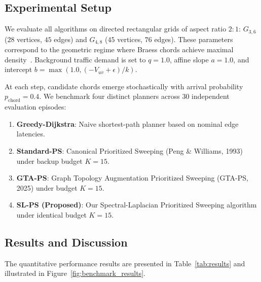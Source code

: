 \documentclass[11pt,a4paper]{article}
\begin{document}
\subsection{Experimental Setup}
We evaluate all algorithms on directed rectangular grids of aspect ratio $2:1$: $G_{3,6}$ ($28$ vertices, $45$ edges) and $G_{4,8}$ ($45$ vertices, $76$ edges). These parameters correspond to the geometric regime where Braess chords achieve maximal density~\cite{lu2026braess}. Background traffic demand is set to $q = 1.0$, affine slope $a = 1.0$, and intercept $b = \max(1.0, (-V_{uv} + \epsilon) / k)$.

At each step, candidate chords emerge stochastically with arrival probability $p_{\text{chord}} = 0.4$. We benchmark four distinct planners across 30 independent evaluation episodes:
\begin{enumerate}
    \item \textbf{Greedy-Dijkstra}: Naive shortest-path planner based on nominal edge latencies.
    \item \textbf{Standard-PS}: Canonical Prioritized Sweeping (Peng \& Williams, 1993) under backup budget $K = 15$.
    \item \textbf{GTA-PS}: Graph Topology Augmentation Prioritized Sweeping (GTA-PS, 2025) under budget $K = 15$.
    \item \textbf{SL-PS (Proposed)}: Our Spectral-Laplacian Prioritized Sweeping algorithm under identical budget $K = 15$.
\end{enumerate}

\subsection{Results and Discussion}

The quantitative performance results are presented in Table~\ref{tab:results} and illustrated in Figure~\ref{fig:benchmark_results}.
\end{document}
